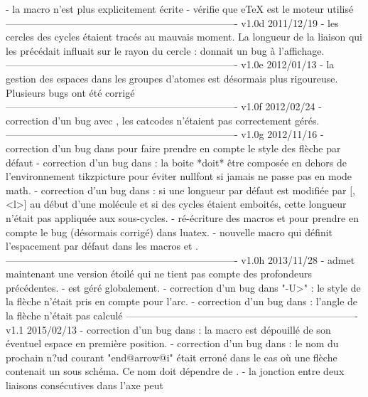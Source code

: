     - la macro \+ n'est plus explicitement écrite
    - vérifie que eTeX est le moteur utilisé
----------------------------------------------------------------------
v1.0d      2011/12/19
    - les cercles des cycles étaient tracés au mauvais moment. La
      longueur de la liaison qui les précédait influait sur le
      rayon du cercle :  donnait un bug
      à l'affichage.
----------------------------------------------------------------------
v1.0e      2012/01/13
    - la gestion des espaces dans les groupes d'atomes est
      désormais plus rigoureuse. Plusieurs bugs ont été
      corrigé
----------------------------------------------------------------------
v1.0f      2012/02/24
    - correction d'un bug avec , les catcodes n'étaient
      pas correctement gérés.
----------------------------------------------------------------------
v1.0g      2012/11/16
    - correction d'un bug dans \CF@direct@arrow pour faire prendre en
      compte le style des flèche par défaut
    - correction d'un bug dans \CF@lewis@c : la boite *doit* être
      composée en dehors de l'environnement tikzpicture pour
      éviter nullfont si jamais \printatom ne passe pas en mode
      math.
    - correction d'un bug dans \CF@chemfig@e : si une longueur par
      défaut est modifiée par [,<l>] au début d'une molécule
      et si des cycles étaient emboités, cette longueur n'était
      pas appliquée aux sous-cycles.
    - ré-écriture des macros \chemabove et \chembemow pour
      prendre en compte le bug (désormais corrigé) dans luatex.
    - nouvelle macro \setstacksep qui définit l'espacement par
      défaut dans les macros \chemabove et \chembelow.
----------------------------------------------------------------------
v1.0h      2013/11/28
    - \chemname admet maintenant une version étoilé qui ne tient
      pas compte des profondeurs précédentes.
    - \CF@dp@max est géré globalement.
    - correction d'un bug dans "-U>" : le style de la flèche
      n'était pris en compte pour l'arc.
    - correction d'un bug dans \CF@direct@arrow : l'angle de la
      flèche n'était pas calculé
----------------------------------------------------------------------
v1.1       2015/02/13
    - correction d'un bug dans \CF@seek@submol : la macro
      \CF@remain@molecule est dépouillé de son éventuel espace
      en première position.
    - correction d'un bug dans \CF@arrow@f : le nom du prochain
      n?ud courant "end@arrow@i" était erroné dans le cas où une
      flèche contenait un sous schéma. Ce nom doit dépendre de
      \CF@scheme@nest.
    - la jonction entre deux liaisons consécutives dans l'axe peut
